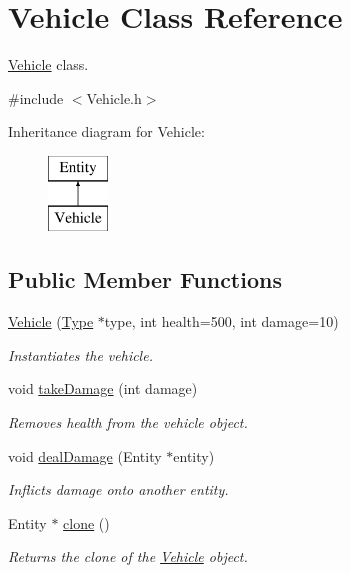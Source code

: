 \hypertarget{classVehicle}{}\section{Vehicle Class Reference}
\label{classVehicle}


\hyperlink{classVehicle}{Vehicle} class.  




{\ttfamily \#include $<$Vehicle.\+h$>$}

Inheritance diagram for Vehicle\+:\begin{figure}[H]
\begin{center}
\leavevmode
\includegraphics[height=2.000000cm]{classVehicle}
\end{center}
\end{figure}
\subsection*{Public Member Functions}
\begin{DoxyCompactItemize}
\item 
\hyperlink{classVehicle_a6fb25af1c4f5a69022a64d25308d60e0}{Vehicle} (\hyperlink{classType}{Type} $\ast$type, int health=500, int damage=10)
\begin{DoxyCompactList}\small\item\em Instantiates the vehicle. \end{DoxyCompactList}\item 
void \hyperlink{classVehicle_ae30a3d13e4d254993acf808a94fdff8d}{take\+Damage} (int damage)
\begin{DoxyCompactList}\small\item\em Removes health from the vehicle object. \end{DoxyCompactList}\item 
void \hyperlink{classVehicle_a8a89569fb092d60bbb172ecd0d4ef4d1}{deal\+Damage} (Entity $\ast$entity)
\begin{DoxyCompactList}\small\item\em Inflicts damage onto another entity. \end{DoxyCompactList}\item 
Entity $\ast$ \hyperlink{classVehicle_a705081c9b479d76cd6113a661d9c8770}{clone} ()
\begin{DoxyCompactList}\small\item\em Returns the clone of the \hyperlink{classVehicle}{Vehicle} object. \end{DoxyCompactList}\end{DoxyCompactItemize}


